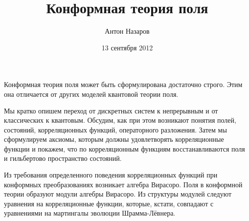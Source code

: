 \documentclass{article}
\title{Конформная теория поля}
\author{Антон Назаров}
\date{13 сентября 2012}
\begin{document}
\maketitle
Конформная теория поля может быть сформулирована достаточно строго.
Этим она отличается от других моделей квантовой теории поля.

Мы кратко опишем переход от дискретных систем к непрерывным и от
классических к квантовым. Обсудим, как при этом возникают понятия
полей, состояний, корреляционных функций, операторного разложения.
Затем мы сформулируем аксиомы, которым должны удовлетворять
корреляционные функции и покажем, что по корреляционным функциям
восстанавливаются поля и гильбертово пространство состояний.

Из требования определенного поведения корреляционных функций при
конформных преобразованиях возникает алгебра Вирасоро. Поля в
конформной теории образуют модули алгебры Вирасоро. Из структуры
модулей следуют уравнения на корреляционные функции, которые, кстати,
совпадают с уравнениями на мартингалы эволюции Шрамма-Лёвнера.
\end{document}
